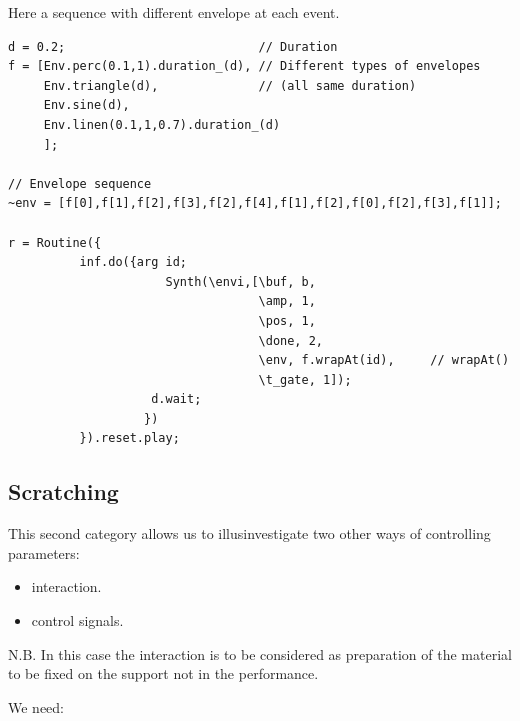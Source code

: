 \begin{itemize}
Here a sequence with different envelope at each event.

\begin{lstlisting}[frame=single] 
d = 0.2;                           // Duration
f = [Env.perc(0.1,1).duration_(d), // Different types of envelopes 
     Env.triangle(d),              // (all same duration)
     Env.sine(d),
     Env.linen(0.1,1,0.7).duration_(d)
     ];

// Envelope sequence
~env = [f[0],f[1],f[2],f[3],f[2],f[4],f[1],f[2],f[0],f[2],f[3],f[1]];   

r = Routine({
          inf.do({arg id;                               
                      Synth(\envi,[\buf, b,
                                   \amp, 1,
                                   \pos, 1,
                                   \done, 2,
                                   \env, f.wrapAt(id),     // wrapAt()
                                   \t_gate, 1]); 
		            d.wait;                  
	               })
          }).reset.play;
\end{lstlisting}

\end{itemize}

\subsection{Scratching}\label{scratching}

This second category allows us to illusinvestigate two other ways of controlling parameters:

\begin{itemize}
\tightlist
\item interaction.
\item control signals.
\end{itemize}

N.B. In this case the interaction is to be considered as preparation of the material to be fixed on the support not in the performance.

We need:

